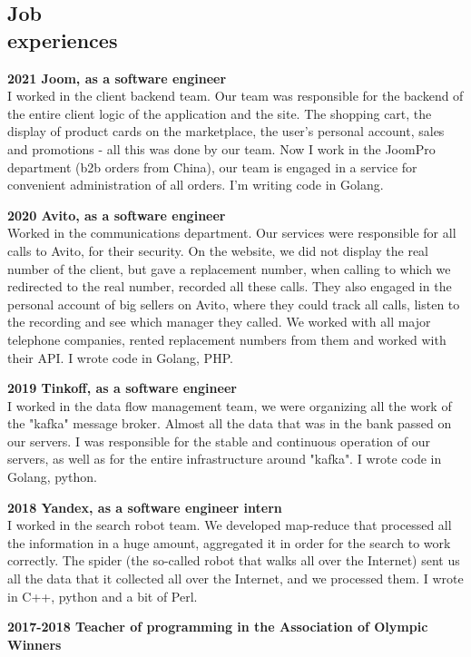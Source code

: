 \documentclass[margin,line,a4paper]{resume}
\begin{document}
\begin{resume}
\section{\mysidestyle Job \\ experiences}
    \textbf{2021 Joom, as a software engineer} \\
    I worked in the client backend team. Our team was responsible for the backend of the entire client logic of the application and the site. The shopping cart, the display of product cards on the marketplace, the user's personal account, sales and promotions - all this was done by our team. Now I work in the JoomPro department (b2b orders from China), our team is engaged in a service for convenient administration of all orders. I'm writing code in Golang. \par
    \textbf{2020 Avito, as a software engineer} \\
    Worked in the communications department. Our services were responsible for all calls to Avito, for their security. On the website, we did not display the real number of the client, but gave a replacement number, when calling to which we redirected to the real number, recorded all these calls. They also engaged in the personal account of big sellers on Avito, where they could track all calls, listen to the recording and see which manager they called. We worked with all major telephone companies, rented replacement numbers from them and worked with their API. I wrote code in Golang, PHP. \par 
    \textbf{2019 Tinkoff, as a software engineer} \\
    I worked in the data flow management team, we were organizing all the work of the "kafka" message broker. Almost all the data that was in the bank passed on our servers. I was responsible for the stable and continuous operation of our servers, as well as for the entire infrastructure around "kafka". I wrote code in Golang, python. \par
    \textbf{2018 Yandex, as a software engineer intern} \\
    I worked in the search robot team. We developed map-reduce that processed all the information in a huge amount, aggregated it in order for the search to work correctly. The spider (the so-called robot that walks all over the Internet) sent us all the data that it collected all over the Internet, and we processed them. I wrote in C++, python and a bit of Perl. \par
    \textbf{2017-2018 Teacher of programming in the  Association of Olympic Winners} \\



\end{resume}
\end{document}

